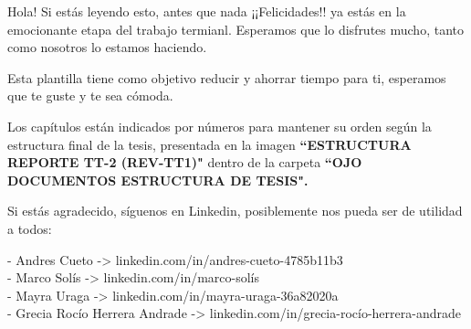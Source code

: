 

Hola! Si estás leyendo esto, antes que nada ¡¡Felicidades!! ya estás en la emocionante etapa del trabajo termianl. Esperamos que lo disfrutes mucho, tanto como nosotros lo estamos haciendo.

Esta plantilla tiene como objetivo reducir y ahorrar tiempo para ti, esperamos que te guste y te sea cómoda. 

Los capítulos están indicados por números para mantener su orden según la estructura final de la tesis, presentada en la imagen \textbf{``ESTRUCTURA REPORTE TT-2 (REV-TT1)"} dentro de la carpeta \textbf{``OJO DOCUMENTOS ESTRUCTURA DE TESIS".}


Si estás agradecido, síguenos en Linkedin, posiblemente nos pueda ser de utilidad a todos:

- Andres Cueto -> linkedin.com/in/andres-cueto-4785b11b3 \\
- Marco Solís -> linkedin.com/in/marco-solís \\
- Mayra Uraga -> linkedin.com/in/mayra-uraga-36a82020a  \\
- Grecia Rocío Herrera Andrade -> linkedin.com/in/grecia-rocío-herrera-andrade \\



